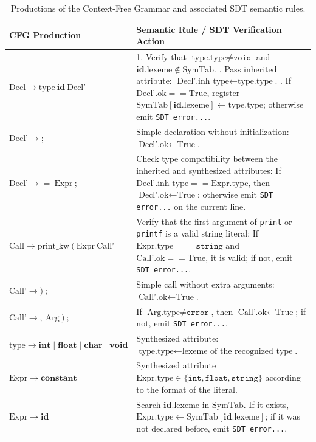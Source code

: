 \documentclass[letterpaper,12pt,oneside]{article}
\begin{document}
\begin{table}[htbp]
\centering
\caption{Productions of the Context-Free Grammar and associated SDT semantic rules.}
\label{tab:sdt_rules}
\begin{tabular}{lp{9cm}}
\toprule
\textbf{CFG Production} & \textbf{Semantic Rule / SDT Verification Action} \\
\midrule
$\text{Decl} \to \text{type} \ \mathbf{id} \ \text{Decl'}$ & 
1. Verify that $\text{type.type} \neq \texttt{void}$ and $\mathbf{id}.\text{lexeme} \notin \text{SymTab}$. \newline
2. Pass inherited attribute: $\text{Decl'.inh\_type} \leftarrow \text{type.type}$. \newline
3. If $\text{Decl'.ok} == \text{True}$, register $\text{SymTab}[\mathbf{id}.\text{lexeme}] \leftarrow \text{type.type}$; otherwise emit \texttt{SDT error...}. \\
\addlinespace
$\text{Decl'} \to \mathbf{;}$ & 
Simple declaration without initialization: $\text{Decl'.ok} \leftarrow \text{True}$. \\
\addlinespace
$\text{Decl'} \to \mathbf{=} \ \text{Expr} \ \mathbf{;}$ & 
Check type compatibility between the inherited and synthesized attributes: \newline
If $\text{Decl'.inh\_type} == \text{Expr.type}$, then $\text{Decl'.ok} \leftarrow \text{True}$; otherwise emit \texttt{SDT error...} on the current line. \\
\addlinespace
$\text{Call} \to \text{print\_kw} \ \mathbf{(} \ \text{Expr} \ \text{Call'}$ & 
Verify that the first argument of \texttt{print} or \texttt{printf} is a valid string literal: \newline
If $\text{Expr.type} == \texttt{string}$ and $\text{Call'.ok} == \text{True}$, it is valid; if not, emit \texttt{SDT error...}. \\
\addlinespace
$\text{Call'} \to \mathbf{)} \ \mathbf{;}$ & 
Simple call without extra arguments: $\text{Call'.ok} \leftarrow \text{True}$. \\
\addlinespace
$\text{Call'} \to \mathbf{,} \ \text{Arg} \ \mathbf{)} \ \mathbf{;}$ & 
If $\text{Arg.type} \neq \texttt{error}$, then $\text{Call'.ok} \leftarrow \text{True}$; if not, emit \texttt{SDT error...}. \\
\addlinespace
$\text{type} \to \mathbf{int} \mid \mathbf{float} \mid \mathbf{char} \mid \mathbf{void}$ & 
Synthesized attribute: $\text{type.type} \leftarrow \text{lexeme of the recognized type}$. \\
\addlinespace
$\text{Expr} \to \mathbf{constant}$ & 
Synthesized attribute $\text{Expr.type} \in \{\texttt{int}, \texttt{float}, \texttt{string}\}$ according to the format of the literal. \\
\addlinespace
$\text{Expr} \to \mathbf{id}$ & 
Search $\mathbf{id}.\text{lexeme}$ in $\text{SymTab}$. If it exists, $\text{Expr.type} \leftarrow \text{SymTab}[\mathbf{id}.\text{lexeme}]$; if it was not declared before, emit \texttt{SDT error...}. \\
\bottomrule
\end{tabular}
\end{table}
\end{document}
